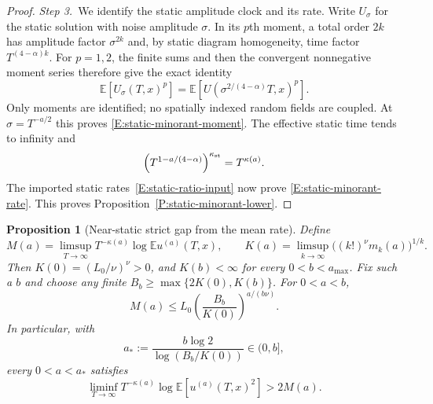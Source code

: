 \documentclass[12pt,oneside,openany]{book}
\numberwithin{equation}{section}
\newtheorem{proposition}[theorem]{Proposition}
\theoremstyle{nogostyle}
\theoremstyle{definition}
\newcommand{\E}{\mathbb{E}}
\begin{document}
\begin{proof}
  \medskip
  \noindent\textit{Step 3.~}We identify the static amplitude clock and its
  rate.
  Write $U_\sigma$ for the static solution with noise amplitude $\sigma$. In its
  $p$th moment, a total order $2k$ has amplitude factor $\sigma^{2k}$ and, by
  static diagram homogeneity, time factor $T^{(4-\alpha)k}$. For $p = 1,2$, the
  finite sums and then the convergent nonnegative moment series therefore give
  the exact identity
  \[
    \E[U_\sigma(T,x)^p]
    =\E[U(\sigma^{2/(4-\alpha)}T,x)^p].
  \]
  Only moments are identified; no spatially indexed random fields are coupled.
  At $\sigma = T^{-a/2}$ this proves \eqref{E:static-minorant-moment}. The
  effective static time tends to infinity and
  \[
    \left(T^{1-a/(4-\alpha)}\right)^{\kappa_{\rm st}}
    =T^{\kappa(a)}.
  \]
  The imported static rates~\eqref{E:static-ratio-input} now prove
  \eqref{E:static-minorant-rate}. This proves
  Proposition~\ref{P:static-minorant-lower}.
\end{proof}

\begin{proposition}[Near-static strict gap from the mean rate]
  \label{P:near-static-mean-gap}
  Define
  \[
    M(a)=\limsup_{T\to\infty}T^{-\kappa(a)}\log\E u^{(a)}(T,x),\qquad
    K(a)=\limsup_{k\to\infty}\big((k!)^\nu m_k(a)\big)^{1/k}.
  \]
  Then $K(0) = (L_0/\nu)^\nu > 0$, and $K(b) < \infty$ for every $0 < b <
  a_{\max}$. Fix such a $b$ and choose any finite $B_b \ge \max\{2K(0),K(b)\}$.
  For $0 < a < b$,
  \begin{equation}\label{E:near-static-mean-upper}
    M(a)\le L_0\left(\frac{B_b}{K(0)}\right)^{a/(b\nu)}.
  \end{equation}
  In particular, with
  \begin{equation}\label{E:near-static-window}
    a_*:=\frac{b\log2}{\log(B_b/K(0))}\in(0,b],
  \end{equation}
  every $0 < a < a_*$ satisfies
  \begin{equation}\label{E:near-static-mean-gap}
    \liminf_{T\to\infty}T^{-\kappa(a)}\log\E[u^{(a)}(T,x)^2]
    >2M(a).
  \end{equation}
\end{proposition}
\end{document}
